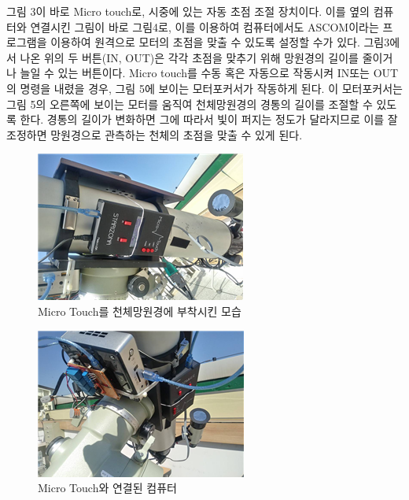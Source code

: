 \documentclass{abstract_hutech}
\begin{document}
그림 3이 바로 Micro touch로, 시중에 있는 자동 초점 조절 장치이다. 이를 옆의 컴퓨터와 연결시킨 그림이 바로 그림4로, 이를 이용하여 컴퓨터에서도 ASCOM이라는 프로그램을 이용하여 원격으로 모터의 초점을 맞출 수 있도록 설정할 수가 있다. 그림3에서 나온 위의 두 버튼(IN, OUT)은 각각 초점을 맞추기 위해 망원경의 길이를 줄이거나 늘일 수 있는 버튼이다. Micro touch를 수동 혹은 자동으로 작동시켜 IN또는 OUT의 명령을 내렸을 경우, 그림 5에 보이는 모터포커서가 작동하게 된다. 이 모터포커서는 그림 5의 오른쪽에 보이는 모터를 움직여 천체망원경의 경통의 길이를 조절할 수 있도록 한다. 경통의 길이가 변화하면 그에 따라서 빛이 퍼지는 정도가 달라지므로 이를 잘 조정하면 망원경으로 관측하는 천체의 초점을 맞출 수 있게 된다.

\begin{figure}[h]
\centering
\includegraphics[width=0.8\linewidth]{telescope1}
\caption{Micro Touch를 천체망원경에 부착시킨 모습}
\label{fig:telescope1}
\end{figure}

\begin{figure}[h]
\centering
\includegraphics[width=0.8\linewidth]{telescope2}
\caption{Micro Touch와 연결된 컴퓨터}
\label{fig:telescope2}
\end{figure}
\end{document}
